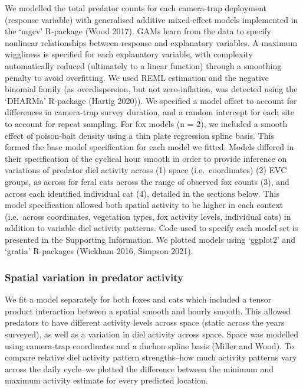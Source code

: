 \documentclass[]{elsarticle} %
\begin{document}
We modelled the total predator counts for each camera-trap deployment (response variable) with generalised additive mixed-effect models implemented in the `mgcv' R-package (Wood 2017). GAMs learn from the data to specify nonlinear relationships between response and explanatory variables. A maximum wiggliness is specified for each explanatory variable, with complexity automatically reduced (ultimately to a linear function) through a smoothing penalty to avoid overfitting. We used REML estimation and the negative binomial family (as overdispersion, but not zero-inflation, was detected using the `DHARMa' R-package (Hartig 2020)). We specified a model offset to account for differences in camera-trap survey duration, and a random intercept for each site to account for repeat sampling. For fox models (n = 2), we included a smooth effect of poison-bait density using a thin plate regression spline basis. This formed the base model specification for each model we fitted. Models differed in their specification of the cyclical hour smooth in order to provide inference on variations of predator diel activity across (1) space (i.e.~coordinates) (2) EVC groups, as across for feral cats across the range of observed fox counts (3), and across each identified individual cat (4), detailed in the sections below. This model specification allowed both spatial activity to be higher in each context (i.e.~across coordinates, vegetation types, fox activity levels, individual cats) in addition to variable diel activity patterns. Code used to specify each model set is presented in the Supporting Information. We plotted models using `ggplot2' and `gratia' R-packages (Wickham 2016, Simpson 2021).

\hypertarget{spatial-variation-in-predator-activity}{%
\subsubsection{Spatial variation in predator activity}\label{spatial-variation-in-predator-activity}}

We fit a model separately for both foxes and cats which included a tensor product interaction between a spatial smooth and hourly smooth. This allowed predators to have different activity levels across space (static across the years surveyed), as well as a variation in diel activity across space. Space was modelled using camera-trap coordinates and a duchon spline basis (Miller and Wood). To compare relative diel activity pattern strengths--how much activity patterns vary across the daily cycle--we plotted the difference between the minimum and maximum activity estimate for every predicted location.
\end{document}

